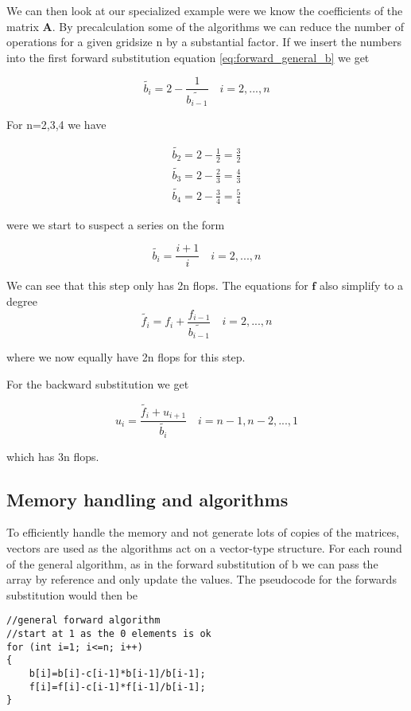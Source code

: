 \documentclass[a4paper,11pt]{article}
\begin{document}
{%


We can then look at our specialized example were we know the coefficients of the matrix $\mathbf{A}$. By precalculation some of the algorithms we can reduce the number of operations for a given gridsize n by a substantial factor. If we insert the numbers into the first forward substitution equation \ref{eq:forward_general_b} we get

\begin{equation}
	\tilde{b_i}=2-\frac{1}{\tilde{b_{i-1}}}\quad i = 2, ..., n
\end{equation}

For n=2,3,4 we have 

\begin{align}
	\tilde{b_2}=2-\frac{1}{2}=\frac{3}{2} \\
	\tilde{b_3}=2-\frac{2}{3}=\frac{4}{3} \\
	\tilde{b_4}=2-\frac{3}{4}=\frac{5}{4}
\end{align}

were we start to suspect a series on the form

\begin{equation}
	\tilde{b_i}=\frac{i+1}{i}  \quad i = 2, ..., n
	\label{eq:forward_specific_b}
\end{equation}

We can see that this step only has 2n flops. The equations for $\mathbf{f}$ also simplify to a degree
\begin{equation}
	\tilde{f_i}=f_{i}+\frac{f_{i-1}}{\tilde{b_{i-1}}}\quad i = 2, ..., n
	\label{eq:forward_specific_f}
\end{equation}

where we now equally have 2n flops for this step. 

For the backward substitution we get 

\begin{equation}
	u_i = \frac{\tilde{f_i} + u_{i+1}}{\tilde{b_i}}\quad i = n-1, n-2, ..., 1
	\label{eq:forward_specific_u}
\end{equation}

which has 3n flops. 

\subsection{Memory handling and algorithms}
To efficiently handle the memory and not generate lots of copies of the matrices, vectors are used as the algorithms act on a vector-type structure. For each round of the general algorithm, as in the forward substitution of b we can pass the array by reference and only update the values. The pseudocode for the forwards substitution would then be
\begin{lstlisting}
//general forward algorithm
//start at 1 as the 0 elements is ok
for (int i=1; i<=n; i++)
{
	b[i]=b[i]-c[i-1]*b[i-1]/b[i-1];
	f[i]=f[i]-c[i-1]*f[i-1]/b[i-1];
}
\end{lstlisting}


}
\end{document}
